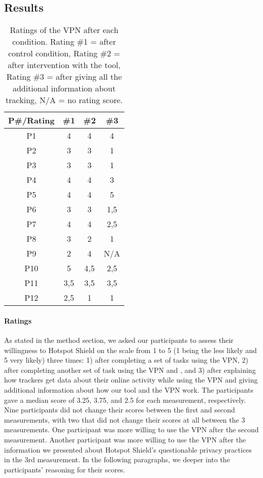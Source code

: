 \subsection{Results}\label{sec:results}

\begin{table}[h!]
\centering
\begin{tabular}{|c c c c|} 
 \hline
P\#/Rating & \#1 & \#2 & \#3 \\
\hline
P1 & 4 & 4 & 4\\
P2 & 3 & 3 & 1\\
P3 & 3 & 3 & 1\\
P4 & 4 & 4 & 3\\
P5 & 4 & 4 & 5\\
P6 & 3 & 3 & 1,5\\
P7 & 4 & 4 & 2,5\\
P8 & 3 & 2 & 1\\
P9 & 2 & 4 & N/A\\
P10 & 5 & 4,5 & 2,5\\
P11 & 3,5 & 3,5 & 3,5\\
P12 & 2,5 & 1 & 1 \\
 \hline
\end{tabular}
\caption{Ratings of the VPN after each condition. Rating \#1 = after control condition, Rating \#2 = after intervention with the tool, Rating \#3 = after giving all the additional information about tracking, N/A = no rating score.}
\label{table:2}
\end{table}

\paragraph{Ratings}

As stated in the method section, we asked our participants to assess their
willingness to Hotspot Shield on the scale from 1 to 5 (1 being the less likely
and 5 very likely) three times: 1) after completing a set of tasks using the
VPN, 2) after completing another set of task using the VPN and \tool, and
3) after explaining how trackers get data about their online activity
while using the VPN and giving additional information about how our tool and the VPN work.  The participants gave a median score of 3.25, 3.75, and 2.5 for each measurement, respectively. Nine participants did not change their scores between the
first and second measurements, with two that did not change their scores at
all between the 3 measurements. One participant was more willing to use the
VPN after the second measurement. Another participant was more willing to
use the VPN after the information we presented about Hotspot Shield's questionable privacy practices in the 3rd measurement.  In the following paragraphs, we deeper into the participants' reasoning for their scores.

